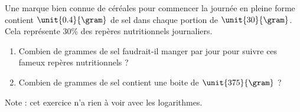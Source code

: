 
\begin{exercice}\label{exologarithme-0003}

    Une marque bien connue de céréales pour commencer la journée en pleine forme contient \( \unit{0.4}{\gram}\) de sel dans chaque portion de \( \unit{30}{\gram}\). Cela représente \( 30\)\% des repères nutritionnels journaliers.
    \begin{enumerate}
        \item
            Combien de grammes de sel faudrait-il manger par jour pour suivre ces fameux repères nutritionnels ?
        \item
            Combien de grammes de sel contient une boite de \( \unit{375}{\gram}\) ?
    \end{enumerate}
    Note : cet exercice n'a rien à voir avec les logarithmes.

\end{exercice}
